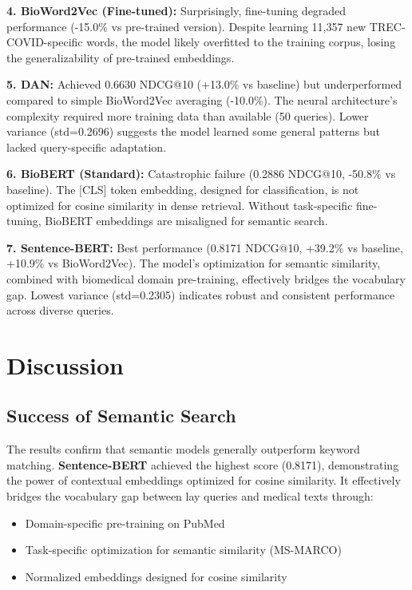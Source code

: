 \documentclass[sigconf,nonacm]{acmart}
\begin{document}
\textbf{4. BioWord2Vec (Fine-tuned):} Surprisingly, fine-tuning degraded performance (-15.0\% vs pre-trained version). Despite learning 11,357 new TREC-COVID-specific words, the model likely overfitted to the training corpus, losing the generalizability of pre-trained embeddings.

\textbf{5. DAN:} Achieved 0.6630 NDCG@10 (+13.0\% vs baseline) but underperformed compared to simple BioWord2Vec averaging (-10.0\%). The neural architecture's complexity required more training data than available (50 queries). Lower variance (std=0.2696) suggests the model learned some general patterns but lacked query-specific adaptation.

\textbf{6. BioBERT (Standard):} Catastrophic failure (0.2886 NDCG@10, -50.8\% vs baseline). The [CLS] token embedding, designed for classification, is not optimized for cosine similarity in dense retrieval. Without task-specific fine-tuning, BioBERT embeddings are misaligned for semantic search.

\textbf{7. Sentence-BERT:} Best performance (0.8171 NDCG@10, +39.2\% vs baseline, +10.9\% vs BioWord2Vec). The model's optimization for semantic similarity, combined with biomedical domain pre-training, effectively bridges the vocabulary gap. Lowest variance (std=0.2305) indicates robust and consistent performance across diverse queries.

\section{Discussion}

\subsection{Success of Semantic Search}
The results confirm that semantic models generally outperform keyword matching. \textbf{Sentence-BERT} achieved the highest score (0.8171), demonstrating the power of contextual embeddings optimized for cosine similarity. It effectively bridges the vocabulary gap between lay queries and medical texts through:
\begin{itemize}
    \item Domain-specific pre-training on PubMed
    \item Task-specific optimization for semantic similarity (MS-MARCO)
    \item Normalized embeddings designed for cosine similarity
\end{itemize}
\end{document}
